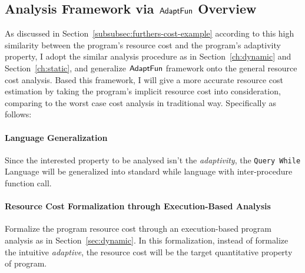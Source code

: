 \subsection*{Analysis Framework via $\textsf{AdaptFun}$ Overview}
\label{sec:generalcost-methodology}
As discussed in Section~\ref{subsubsec:furthers-cost-example}
according to this high similarity between the program's resource cost and the 
program's adaptivity property, I adopt the similar analysis procedure as in Section~\ref{ch:dynamic} and 
Section~\ref{ch:static},
and generalize 
$\textsf{AdaptFun}$ framework onto the general resource cost analysis. 
Based this framework,
I will give
a more accurate resource cost estimation by taking the program's implicit resource cost into consideration, comparing 
to the worst case cost analysis in traditional way. Specifically as follows:
\paragraph*{Language Generalization} Since the interested property 
to be analysed isn't the \emph{adaptivity},
the {\tt Query While} Language will be generalized into standard while language with inter-procedure function call.
\paragraph*{Resource Cost Formalization through Execution-Based Analysis} 
Formalize the program resource cost through an execution-based program analysis as in Section~\ref{sec:dynamic}.
In this formalization, instead of formalize the intuitive \emph{adaptive}, the resource cost will be the
target quantitative property of program.
